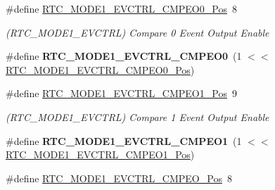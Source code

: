 \begin{DoxyCompactItemize}
\item 
\hypertarget{group___s_a_m_l21___r_t_c_ga37bab4782c298950d03ab4d937efa053}{}\#define \hyperlink{group___s_a_m_l21___r_t_c_ga37bab4782c298950d03ab4d937efa053}{R\+T\+C\+\_\+\+M\+O\+D\+E1\+\_\+\+E\+V\+C\+T\+R\+L\+\_\+\+C\+M\+P\+E\+O0\+\_\+\+Pos}~8\label{group___s_a_m_l21___r_t_c_ga37bab4782c298950d03ab4d937efa053}

\begin{DoxyCompactList}\small\item\em (R\+T\+C\+\_\+\+M\+O\+D\+E1\+\_\+\+E\+V\+C\+T\+R\+L) Compare 0 Event Output Enable \end{DoxyCompactList}\item 
\hypertarget{group___s_a_m_l21___r_t_c_gaf50ea838de36344ef1a41cf4ee0d7ff5}{}\#define {\bfseries R\+T\+C\+\_\+\+M\+O\+D\+E1\+\_\+\+E\+V\+C\+T\+R\+L\+\_\+\+C\+M\+P\+E\+O0}~(1 $<$$<$ \hyperlink{group___s_a_m_l21___r_t_c_ga37bab4782c298950d03ab4d937efa053}{R\+T\+C\+\_\+\+M\+O\+D\+E1\+\_\+\+E\+V\+C\+T\+R\+L\+\_\+\+C\+M\+P\+E\+O0\+\_\+\+Pos})\label{group___s_a_m_l21___r_t_c_gaf50ea838de36344ef1a41cf4ee0d7ff5}

\item 
\hypertarget{group___s_a_m_l21___r_t_c_ga9331514aa5044b64fa968b6421e183b9}{}\#define \hyperlink{group___s_a_m_l21___r_t_c_ga9331514aa5044b64fa968b6421e183b9}{R\+T\+C\+\_\+\+M\+O\+D\+E1\+\_\+\+E\+V\+C\+T\+R\+L\+\_\+\+C\+M\+P\+E\+O1\+\_\+\+Pos}~9\label{group___s_a_m_l21___r_t_c_ga9331514aa5044b64fa968b6421e183b9}

\begin{DoxyCompactList}\small\item\em (R\+T\+C\+\_\+\+M\+O\+D\+E1\+\_\+\+E\+V\+C\+T\+R\+L) Compare 1 Event Output Enable \end{DoxyCompactList}\item 
\hypertarget{group___s_a_m_l21___r_t_c_ga8513edb74751c07bf73e6393d6b38dfd}{}\#define {\bfseries R\+T\+C\+\_\+\+M\+O\+D\+E1\+\_\+\+E\+V\+C\+T\+R\+L\+\_\+\+C\+M\+P\+E\+O1}~(1 $<$$<$ \hyperlink{group___s_a_m_l21___r_t_c_ga9331514aa5044b64fa968b6421e183b9}{R\+T\+C\+\_\+\+M\+O\+D\+E1\+\_\+\+E\+V\+C\+T\+R\+L\+\_\+\+C\+M\+P\+E\+O1\+\_\+\+Pos})\label{group___s_a_m_l21___r_t_c_ga8513edb74751c07bf73e6393d6b38dfd}

\item 
\hypertarget{group___s_a_m_l21___r_t_c_ga0a18e318546dc40f49df011fda9bf956}{}\#define \hyperlink{group___s_a_m_l21___r_t_c_ga0a18e318546dc40f49df011fda9bf956}{R\+T\+C\+\_\+\+M\+O\+D\+E1\+\_\+\+E\+V\+C\+T\+R\+L\+\_\+\+C\+M\+P\+E\+O\+\_\+\+Pos}~8\label{group___s_a_m_l21___r_t_c_ga0a18e318546dc40f49df011fda9bf956}


\end{DoxyCompactItemize}

